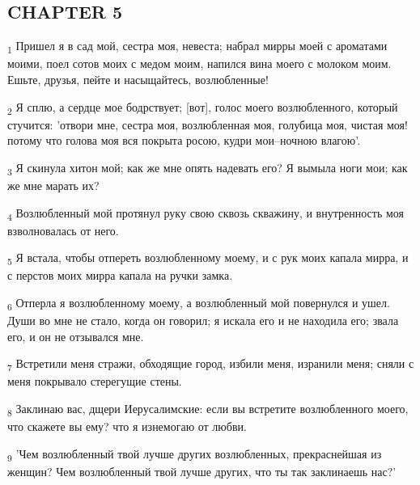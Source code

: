 \subsection{CHAPTER 5}
\begin{tcolorbox}
\textsubscript{1} Пришел я в сад мой, сестра моя, невеста; набрал мирры моей с ароматами моими, поел сотов моих с медом моим, напился вина моего с молоком моим. Ешьте, друзья, пейте и насыщайтесь, возлюбленные!
\end{tcolorbox}
\begin{tcolorbox}
\textsubscript{2} Я сплю, а сердце мое бодрствует; [вот], голос моего возлюбленного, который стучится: 'отвори мне, сестра моя, возлюбленная моя, голубица моя, чистая моя! потому что голова моя вся покрыта росою, кудри мои--ночною влагою'.
\end{tcolorbox}
\begin{tcolorbox}
\textsubscript{3} Я скинула хитон мой; как же мне опять надевать его? Я вымыла ноги мои; как же мне марать их?
\end{tcolorbox}
\begin{tcolorbox}
\textsubscript{4} Возлюбленный мой протянул руку свою сквозь скважину, и внутренность моя взволновалась от него.
\end{tcolorbox}
\begin{tcolorbox}
\textsubscript{5} Я встала, чтобы отпереть возлюбленному моему, и с рук моих капала мирра, и с перстов моих мирра капала на ручки замка.
\end{tcolorbox}
\begin{tcolorbox}
\textsubscript{6} Отперла я возлюбленному моему, а возлюбленный мой повернулся и ушел. Души во мне не стало, когда он говорил; я искала его и не находила его; звала его, и он не отзывался мне.
\end{tcolorbox}
\begin{tcolorbox}
\textsubscript{7} Встретили меня стражи, обходящие город, избили меня, изранили меня; сняли с меня покрывало стерегущие стены.
\end{tcolorbox}
\begin{tcolorbox}
\textsubscript{8} Заклинаю вас, дщери Иерусалимские: если вы встретите возлюбленного моего, что скажете вы ему? что я изнемогаю от любви.
\end{tcolorbox}
\begin{tcolorbox}
\textsubscript{9} 'Чем возлюбленный твой лучше других возлюбленных, прекраснейшая из женщин? Чем возлюбленный твой лучше других, что ты так заклинаешь нас?'
\end{tcolorbox}
